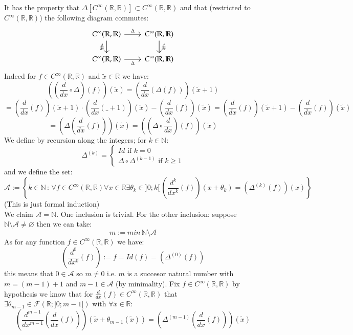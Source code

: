 \documentclass[11pt, a4paper, oneside]{article}
\theoremstyle{remark}
\theoremstyle{lemma}
\begin{document}
It has the property that $\Delta[C^{\infty}(\mathbb{R},\mathbb{R})]\subset C^{\infty}(\mathbb{R},\mathbb{R})$ and that (restricted to $C^{\infty}(\mathbb{R},\mathbb{R})$) the following diagram commutes:
\[\begin{tikzcd}
	{C^{\infty}(\mathbb{R},\mathbb{R})} & {C^{\infty}(\mathbb{R},\mathbb{R})} \\
	{C^{\infty}(\mathbb{R},\mathbb{R})} & {C^{\infty}(\mathbb{R},\mathbb{R})}
	\arrow["\Delta", from=1-1, to=1-2]
	\arrow["{\frac{d}{dx}}"', from=1-1, to=2-1]
	\arrow["{\frac{d}{dx}}", from=1-2, to=2-2]
	\arrow["\Delta"', from=2-1, to=2-2]
\end{tikzcd}\]
Indeed for $f\in C^{\infty}(\mathbb{R},\mathbb{R})$ and $\tilde{x}\in\mathbb{R}$ we have:
$$\left((\frac{d}{dx}\circ\Delta) (f)\right)(\tilde{x})=\left(\frac{d}{dx}(\Delta(f))\right)(\tilde{x}+1)$$
$$=\left(\frac{d}{dx}(f)\right)(\tilde{x}+1)\cdot \left(\frac{d}{dx}(\_+1)\right)(\tilde{x})-\left(\frac{d}{dx}(f)\right)(\tilde{x})=\left(\frac{d}{dx}(f)\right)(\tilde{x}+1)-\left(\frac{d}{dx}(f)\right)(\tilde{x})$$
$$=\left(\Delta\left(\frac{d}{dx}(f)\right)\right)(\tilde{x})=\left((\Delta\circ\frac{d}{dx})(f)\right)(\tilde{x})$$
We define by recursion along the integers; for $k\in\mathbb{N}$:
$$\Delta^{(k)}=\begin{cases}
    Id\text{ if } k = 0\\
    \Delta\circ \Delta^{(k-1)}\text{ if } k\geq 1
\end{cases}$$
and we define the set:
$$\mathcal{A}:=\left\{k\in\mathbb{N}\,:\, \forall f\in C^{\infty}(\mathbb{R},\mathbb{R})\forall x\in\mathbb{R}\exists\theta_{k}\in]0;k[\, \left(\frac{d^k}{dx^k}(f)\right)(x+\theta_{k})=(\Delta^{(k)}(f))(x)\right\}$$
(This is just formal induction)
\\We claim $\mathcal{A}=\mathbb{N}$. One inclusion is trivial. For the other inclusion: suppose $\mathbb{N}\setminus\mathcal{A}\neq\varnothing$ then we can take:
$$m:=min\, \mathbb{N}\setminus\mathcal{A}$$
As for any function $f\in C^{\infty}(\mathbb{R},\mathbb{R})$ we have:
$$\left(\frac{d^0}{dx^0}(f)\right):=f=Id(f)=(\Delta^{(0)}(f))$$ this means that $0\in\mathcal{A}$ so $m\neq 0$ i.e. $m$ is a succesor natural number with $m=(m-1)+1$ and $m-1\in\mathcal{A}$ (by minimality). Fix $f\in C^{\infty}(\mathbb{R},\mathbb{R})$ by hypothesis we know 
that for $\frac{d}{dx}(f)\in C^{\infty}(\mathbb{R},\mathbb{R})$ that $\exists \theta_{m-1}\in\mathcal{F}(\mathbb{R};]0;m-1[)$ with $\forall \tilde{x}\in\mathbb{R}$:
$$\left(\frac{d^{m-1}}{dx^{m-1}}\left(\frac{d}{dx}(f)\right)\right)(\tilde{x}+\theta_{m-1}(\tilde{x}))=\left(\Delta^{(m-1)}\left(\frac{d}{dx}(f)\right)\right)(\tilde{x})
$$
\end{document}
